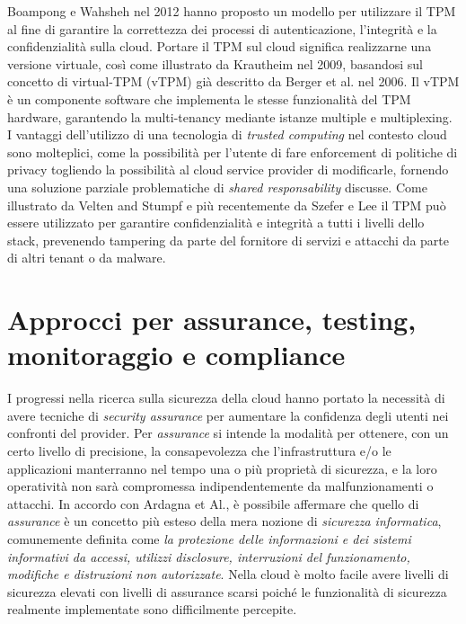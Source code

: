 \documentclass[../main.tex]{subfiles}
\begin{document}
Boampong e Wahsheh nel 2012 hanno proposto un modello per utilizzare il TPM al fine di garantire la correttezza dei processi di autenticazione, l'integrità e la confidenzialità sulla cloud\cite{Boampong:2012:DFS:2331762.2331767}.
Portare il TPM sul cloud significa realizzarne una versione virtuale, così come illustrato da Krautheim\cite{Krautheim:2009:PVI:1855533.1855538} nel 2009, basandosi sul concetto di virtual-TPM (vTPM) già descritto da Berger et al. nel 2006\cite{Berger:2006:VVT:1267336.1267357}.
Il vTPM è un componente software che implementa le stesse funzionalità del TPM hardware, garantendo la multi-tenancy mediante istanze multiple e multiplexing.
I vantaggi dell'utilizzo di una tecnologia di \textit{trusted computing} nel contesto cloud sono molteplici, come la possibilità per l'utente di fare enforcement di politiche di privacy togliendo la possibilità al cloud service provider di modificarle, fornendo una soluzione parziale problematiche di \textit{shared responsability} discusse. 
Come illustrato da Velten and Stumpf\cite{Velten2013} e più recentemente da Szefer e Lee\cite{SzeferLee} il TPM può essere utilizzato per garantire confidenzialità e integrità a tutti i livelli dello stack, prevenendo tampering da parte del fornitore di servizi e attacchi da parte di altri tenant o da malware.


\section{Approcci per assurance, testing, monitoraggio e compliance}
I progressi nella ricerca sulla sicurezza della cloud hanno portato la necessità di avere tecniche di \textit{security assurance} per aumentare la confidenza degli utenti nei confronti del provider\cite{6814039}.
Per \textit{assurance} si intende la modalità per ottenere, con un certo livello di precisione, la consapevolezza che l'infrastruttura e/o le applicazioni manterranno nel tempo una o più proprietà di sicurezza, e la loro operatività non sarà compromessa indipendentemente da malfunzionamenti o attacchi\cite{goertzel2007software}.
In accordo con Ardagna et Al.\cite{Ardagna:2015:SAC:2808687.2767005}, è possibile affermare che quello di \textit{assurance} è un concetto più esteso della mera nozione di \textit{sicurezza informatica}, comunemente definita come \textit{la protezione delle informazioni e dei sistemi informativi da accessi, utilizzi disclosure, interruzioni del funzionamento, modifiche e distruzioni non autorizzate}.
Nella cloud è molto facile avere livelli di sicurezza elevati con livelli di assurance scarsi poiché le funzionalità di sicurezza realmente implementate sono difficilmente percepite. 
\end{document}
